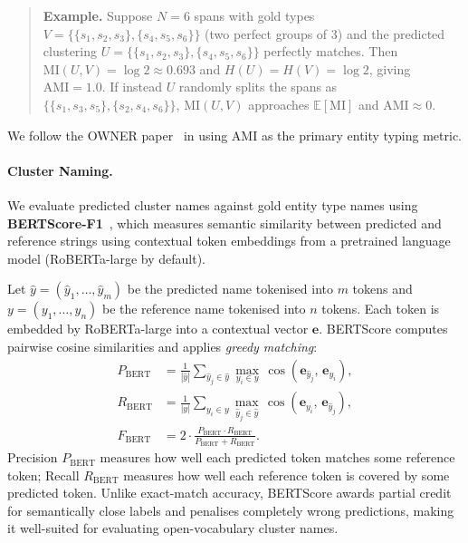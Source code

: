 \documentclass[14pt]{extreport}
\begin{document}
\begin{quote}\small
\textbf{Example.}
Suppose $N = 6$ spans with gold types $V = \{\{s_1,s_2,s_3\},\{s_4,s_5,s_6\}\}$ (two perfect groups of 3) and the predicted clustering $U = \{\{s_1,s_2,s_3\},\{s_4,s_5,s_6\}\}$ perfectly matches. Then $\text{MI}(U,V) = \log 2 \approx 0.693$ and $H(U) = H(V) = \log 2$, giving $\text{AMI} = 1.0$. If instead $U$ randomly splits the spans as $\{\{s_1,s_3,s_5\},\{s_2,s_4,s_6\}\}$, $\text{MI}(U,V)$ approaches $\mathbb{E}[\text{MI}]$ and $\text{AMI} \approx 0$.
\end{quote}

We follow the OWNER paper~\cite{wang-etal-2023-crossner} in using AMI as the primary entity typing metric.

\paragraph{Cluster Naming.}
We evaluate predicted cluster names against gold entity type names using \textbf{BERTScore-F1}~\cite{zhang-etal-2020-bertscore}, which measures semantic similarity between predicted and reference strings using contextual token embeddings from a pretrained language model (RoBERTa-large by default).

Let $\hat{y} = (\hat{y}_1, \ldots, \hat{y}_m)$ be the predicted name tokenised into $m$ tokens and $y = (y_1, \ldots, y_n)$ be the reference name tokenised into $n$ tokens. Each token is embedded by RoBERTa-large into a contextual vector $\mathbf{e}$. BERTScore computes pairwise cosine similarities and applies \emph{greedy matching}:
\begin{align}
    P_{\text{BERT}} &= \frac{1}{|\hat{y}|} \sum_{\hat{y}_j \in \hat{y}} \max_{y_i \in y}\, \cos(\mathbf{e}_{\hat{y}_j},\, \mathbf{e}_{y_i}),
    \label{eq:bertscore_p} \\
    R_{\text{BERT}} &= \frac{1}{|y|} \sum_{y_i \in y} \max_{\hat{y}_j \in \hat{y}}\, \cos(\mathbf{e}_{y_i},\, \mathbf{e}_{\hat{y}_j}),
    \label{eq:bertscore_r} \\
    F_{\text{BERT}} &= 2 \cdot \frac{P_{\text{BERT}} \cdot R_{\text{BERT}}}{P_{\text{BERT}} + R_{\text{BERT}}}.
    \label{eq:bertscore_f}
\end{align}
Precision $P_{\text{BERT}}$ measures how well each predicted token matches some reference token; Recall $R_{\text{BERT}}$ measures how well each reference token is covered by some predicted token. Unlike exact-match accuracy, BERTScore awards partial credit for semantically close labels and penalises completely wrong predictions, making it well-suited for evaluating open-vocabulary cluster names.
\end{document}
